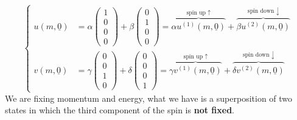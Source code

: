 \documentclass[../main.tex]{subfiles}
\begin{document}
\[
\left\{
\begin{aligned}
u(m,\underline{0})&=\alpha\left(\begin{array}{c}
    1 \\
    0 \\
    0 \\
    0
\end{array}\right)+\beta\left(\begin{array}{c}
    0 \\
    1 \\
    0 \\
    0
\end{array}\right)=\overbrace{\alpha u^{(1)}(m,\underline{0})}^{\text{spin up $\uparrow$}}+\overbrace{\beta u^{(2)}(m,\underline{0})}^{\text{spin down $\downarrow$}}\\
v(m,\underline{0})&=\gamma\left(\begin{array}{c}
    0 \\
    0 \\
    1 \\
    0
\end{array}\right)+\delta\left(\begin{array}{c}
    0 \\
    0 \\
    0 \\
    1
\end{array}\right)=\overbrace{\gamma v^{(1)}(m,\underline{0})}^{\text{spin up $\uparrow$}}+\overbrace{\delta v^{(2)}(m,\underline{0})}^{\text{spin down $\downarrow$}}
\end{aligned}
\right.
\]
We are fixing momentum and energy, what we have is a superposition of two states in which the third component of the spin is \textbf{not fixed}.
\end{document}
